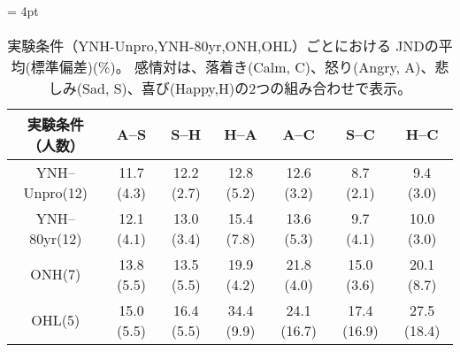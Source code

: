 


\begin{table*}[h]
  \vspace{30pt}
  \caption{
    実験条件（YNH-Unpro,YNH-80yr,ONH,OHL）ごとにおける JNDの平均(標準偏差)(\%)。
    感情対は、落着き(Calm, C)、怒り(Angry, A)、悲しみ(Sad, S)、喜び(Happy,H)の2つの組み合わせで表示。
  }
  \label{tab:JND_All}
  \tabcolsep= 4pt
  \centering
  \begin{tabular}{c|ccc|ccc}	
  \toprule
  実験条件（人数） & A--S & S--H & H--A & A--C & S--C & H--C\\
  \midrule
  YNH--Unpro(12) & 11.7 (4.3) & 12.2 (2.7) & 12.8 (5.2) & 12.6 (3.2) & 8.7 (2.1)  &  9.4 (3.0)  \\
  YNH--80yr(12)  & 12.1 (4.1)  & 13.0 (3.4) & 15.4 (7.8) & 13.6 (5.3)  & 9.7 (4.1) & 10.0 (3.0) \\
  \hline
  ONH(7)         & 13.8 (5.5)  & 13.5 (5.5) & 19.9 (4.2) & 21.8 (4.0)  & 15.0 (3.6) & 20.1 (8.7) \\
  OHL(5)         & 15.0 (5.5)  & 16.4 (5.5) & 34.4 (9.9) & 24.1 (16.7)  & 17.4 (16.9) & 27.5 (18.4)\\ 

  \bottomrule
  \end{tabular}
  \vspace{10pt}
\end{table*}

